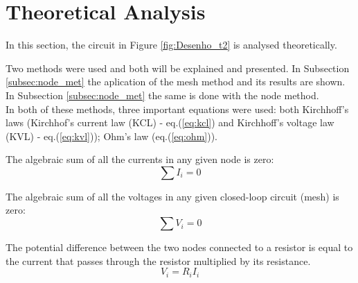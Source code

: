 
\section{Theoretical Analysis}
\label{sec:analysis}



In this section, the circuit in Figure \ref{fig:Desenho_t2} is analysed theoretically.

Two methods were used and both will be explained and presented. In Subsection \ref{subsec:node_met}
the aplication of the mesh method and its results are shown. In Subsection \ref{subsec:node_met} the
same is done with the node method. \\

In both of these methods, three important equations were used: both Kirchhoff's laws (Kirchhof's
current law (KCL) - eq.(\ref{eq:kcl}) and Kirchhoff's voltage law (KVL) - eq.(\ref{eq:kvl}));
Ohm's law (eq.(\ref{eq:ohm})).

The algebraic sum of all the currents in any given node is zero:
\begin{equation}
	\sum I_i = 0
	\label{eq:kcl}
\end{equation}

The algebraic sum of all the voltages in any given closed-loop circuit (mesh) is zero:
\begin{equation}
	\sum V_i = 0
	\label{eq:kvl}
\end{equation}

The potential difference between the two nodes connected to a resistor is equal to the current that 
passes through the resistor multiplied by its resistance.
\begin{equation}
	V_i = R_iI_i
	\label{eq:ohm}
\end{equation}




